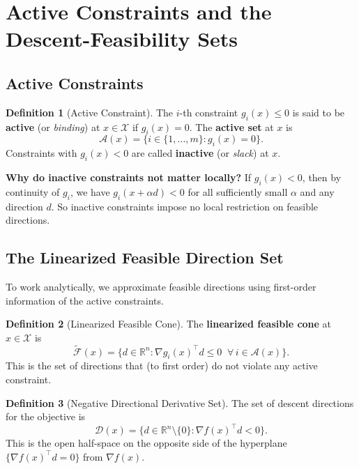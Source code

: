 \documentclass[11pt]{article}
\theoremstyle{definition}
\newtheorem{definition}{Definition}
\theoremstyle{plain}
\theoremstyle{remark}
\begin{document}
\section{Active Constraints and the Descent-Feasibility Sets}

\subsection{Active Constraints}

\begin{definition}[Active Constraint]
  The $i$-th constraint $g_i(x) \leq 0$ is said to be \textbf{active} (or \emph{binding}) at $x \in \mathcal{X}$ if $g_i(x) = 0$. The \textbf{active set} at $x$ is
  \[
    \mathcal{A}(x) = \{i \in \{1, \ldots, m\} : g_i(x) = 0\}.
  \]
  Constraints with $g_i(x) < 0$ are called \textbf{inactive} (or \emph{slack}) at $x$.
\end{definition}

\textbf{Why do inactive constraints not matter locally?}
If $g_i(x) < 0$, then by continuity of $g_i$, we have $g_i(x + \alpha d) < 0$ for all sufficiently small $\alpha$ and any direction $d$. So inactive constraints impose no local restriction on feasible directions.

\subsection{The Linearized Feasible Direction Set}

To work analytically, we approximate feasible directions using first-order information of the active constraints.

\begin{definition}[Linearized Feasible Cone]
  \label{def:lin_feasible}
  The \textbf{linearized feasible cone} at $x \in \mathcal{X}$ is
  \[
    \widetilde{\mathcal{F}}(x) = \{d \in \mathbb{R}^n : \nabla g_i(x)^\top d \leq 0 \;\; \forall\, i \in \mathcal{A}(x)\}.
  \]
  This is the set of directions that (to first order) do not violate any active constraint.
\end{definition}

\begin{definition}[Negative Directional Derivative Set]
  The set of descent directions for the objective is
  \[
    \mathcal{D}(x) = \{d \in \mathbb{R}^n \setminus \{0\} : \nabla f(x)^\top d < 0\}.
  \]
  This is the open half-space on the opposite side of the hyperplane $\{\nabla f(x)^\top d = 0\}$ from $\nabla f(x)$.
\end{definition}
\end{document}
